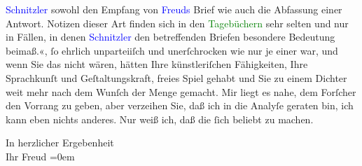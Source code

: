 {{{                     \textcolor{blue}{Schnitzler} sowohl den Empfang von \textcolor{blue}{Freuds} Brief wie auch die Abfassung einer
                     Antwort. Notizen dieser Art finden sich in den \textcolor{green}{Tagebüchern} sehr selten und nur
                     in Fällen, in denen \textcolor{blue}{Schnitzler} den betreffenden Briefen besondere Bedeutung beimaß.«}}}\label{K_L03887-3}, ſo ehrlich unparteiiſch und unerſchrocken wie nur
               je einer war, und wenn Sie das nicht wären, hätten Ihre künstleriſchen Fähigkeiten,
               Ihre Sprachkunſt und Geſtaltungskraft, freies Spiel gehabt und Sie zu einem Dichter
               weit mehr nach dem Wunſch der Menge gemacht. Mir liegt es nahe, dem Forſcher den
               Vorrang zu geben, aber verzeihen Sie, daß ich in die Analyſe geraten bin, ich kann
               eben nichts anderes. Nur weiß ich, daß die \label{T_L03887-2v}\label{T_L03887-2} ſich beliebt zu machen.\pend
           
\pstart
           In herzlicher Ergebenheit{\\[\baselineskip]} Ihr \spacefill\mbox{Freud}\pend
           \leftskip=0em{}\endnumbering{}
\begin{anhang}
\end{anhang}
      